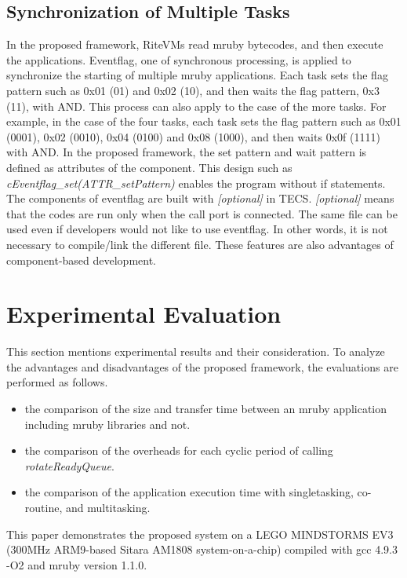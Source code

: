 \documentclass[conference,compsoc]{IEEEtran}
\begin{document}
\subsection{Synchronization of Multiple Tasks}
In the proposed framework, RiteVMs read mruby bytecodes, and then execute the applications.
Eventflag, one of synchronous processing, is applied to synchronize the starting of multiple mruby applications.
Each task sets the flag pattern such as 0x01 (01) and 0x02 (10), and then waits the flag pattern, 0x3 (11), with AND.
This process can also apply to the case of the more tasks.
For example, in the case of the four tasks, each task sets the flag pattern such as 0x01 (0001), 0x02 (0010), 0x04 (0100)  and 0x08 (1000), and then waits 0x0f (1111) with AND.
In the proposed framework, the set pattern and wait pattern is defined as attributes of the component.
This design such as {\it cEventflag\_set(ATTR\_setPattern)} enables the program without if statements.
The components of eventflag are built with {\it [optional]} in TECS.
{\it [optional]} means that the codes are run only when the call port is connected.
The same file can be used even if developers would not like to use eventflag.
In other words, it is not necessary to compile/link the different file.
These features are also advantages of component-based development.

\section{Experimental Evaluation}
\label{sec:Evaluation}
This section mentions experimental results and their consideration.
To analyze the advantages and disadvantages of the proposed framework, the evaluations are performed as follows.
\begin{itemize}
        \item the comparison of the size and transfer time between an mruby application including mruby libraries and not.
        \item the comparison of the overheads for each cyclic period of calling {\it rotateReadyQueue}.
        \item the comparison of the application execution time with singletasking, co-routine, and multitasking.
\end{itemize}

This paper demonstrates the proposed system on a LEGO MINDSTORMS EV3 (300MHz ARM9-based Sitara AM1808 system-on-a-chip) compiled with gcc 4.9.3 -O2 and mruby version 1.1.0.
\end{document}
